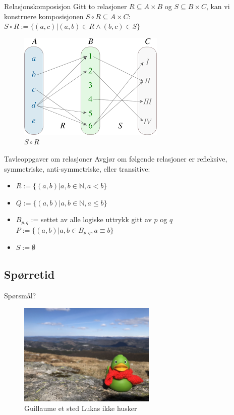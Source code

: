 \begin{frame}{Relasjonskomposisjon}
    Gitt to relasjoner $R \subseteq A \times B$ og $S \subseteq B \times C$, kan vi konstruere komposisjonen $S \circ R \subseteq A \times C$:\\
    $S \circ R := \{(a, c) | (a, b) \in R \land (b, c) \in S\}$
    
    \begin{figure}
        \centering
        \includegraphics[scale=0.5]{ros.png}
        \caption{$S \circ R$}
        \label{fig:my_label2}
    \end{figure}
\end{frame}

\begin{frame}{Tavleoppgaver om relasjoner}
Avgjør om følgende relasjoner er refleksive, symmetriske, anti-symmetriske, eller transitive:\\
    \begin{itemize}
        \item $R := \{(a, b) | a, b \in \mathbb{N}, a < b\}$
        \item $Q := \{(a, b) | a, b \in \mathbb{N}, a \leq b\}$
        \item $B_{p, q}$ := settet av alle logiske uttrykk gitt av $p$ og $q$\\
              $P := \{(a, b) | a, b \in B_{p, q}, a \equiv b\}$
        \item $S := \emptyset$
    \end{itemize}
\end{frame}

\subsection*{Spørretid}
\begin{frame}{Spørsmål?}
    \begin{figure}
        \centering
        \includegraphics[height = 4.9cm]{images/guillaume3.jpg}
        \caption{Guillaume et sted Lukas ikke husker}
        \label{fig:guillaume3}
    \end{figure}
\end{frame}

